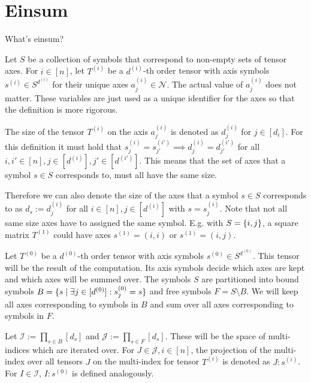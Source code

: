 \section{Einsum}

What's einsum?

Let $S$ be a collection of symbols that correspond to non-empty sets of tensor axes.
For $i \in [n]$, let $T^{(i)}$ be a $d^{(i)}$-th order tensor with axis symbols $s^{(i)} \in S^{d^{(i)}}$ for their unique axes $a^{(i)}_j \in \mathcal{N}$.
The actual value of $a^{(i)}_j$ does not matter. These variables are just used as a unique identifier for the axes so that the definition is more rigorous.

The size of the tensor $T^{(i)}$ on the axis $a^{(i)}_j$ is denoted as $d^{(i)}_j$ for $j \in [d_i]$.
For this definition it must hold that $s^{(i)}_j = s^{(i')}_{j'} \implies d^{(i)}_j = d^{(i')}_{j'}$ for all $i,i' \in [n], j \in [d^{(i)}], j' \in [d^{(i')}]$.
This means that the set of axes that a symbol $s \in S$ corresponds to, must all have the same size.

Therefore we can also denote the size of the axes that a symbol $s \in S$ corresponds to as $d_s := d^{(i)}_j$ for all $i \in [n], j \in [d^{(i)}]$ with $s = s^{(i)}_j$.
Note that not all same size axes have to assigned the same symbol. E.g. with $S = \left\lbrace i,j \right\rbrace$, a square matrix $T^{(1)}$ could have axes $s^{(1)} = (i, i)$ or $s^{(1)} = (i, j)$.

Let $T^{(0)}$ be a $d^{(0)}$-th order tensor with axis symbols $s^{(0)} \in S^{d^{(0)}}$.
This tensor will be the result of the computation.
Its axis symbols decide which axes are kept and which axes will be summed over.
The symbols $S$ are partitioned into bound symbols $B = \lbrace s \mid \exists j \in [d^{(0)}]: s^{(0)}_j = s \rbrace$ and  free symbols $F = S \setminus B$.
We will keep all axes corresponding to symbols in $B$ and sum over all axes corresponding to symbols in $F$.

Let $\mathcal{I} := \prod_{s \in B} [d_s]$ and $\mathcal{J} := \prod_{s \in F} [d_s]$.
These will be the space of multi-indices which are iterated over.
For $J \in \mathcal{J}, i \in [n]$, the projection of the multi-index over all tensors $J$ on the multi-index for tensor $T^{(i)}$ is denoted as $J:s^{(i)}$.
For $I \in \mathcal{I}$, $I:s^{(0)}$ is defined analogously.

